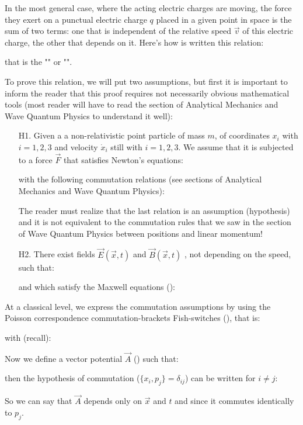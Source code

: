 	In the most general case, where the acting electric charges are moving, the force they exert on a punctual electric charge $q$ placed in a given point in space is the sum of two terms: one that is independent of the relative speed $\vec{v}$ of this electric charge, the other that depends on it. Here's how is written this relation:
	
	that is the "" or "".
	
	To prove this relation, we will put two assumptions, but first it is important to inform the reader that this proof requires not necessarily obvious mathematical tools (most reader will have to read the section of Analytical Mechanics and Wave Quantum Physics to understand it well):
	\begin{enumerate}
		\item[H1.] Given a a non-relativistic point particle of mass $m$, of coordinates $x_i$ with $i=1,2,3$ and velocity $\dot{x}_i$ still with $i=1,2,3$. We assume that it is subjected to a force $\vec{F}$ that satisfies Newton's equations:
		
		with the following commutation relations (see sections of Analytical Mechanics and Wave Quantum Physics):
		
	 	The reader must realize that the last relation is an assumption (hypothesis) and it is not equivalent to the commutation rules that we saw in the section of Wave Quantum Physics between positions and linear momentum!

		\item[H2.] There exist fields $\vec{E}(\vec{x},t)$ and $\vec{B}(\vec{x},t)$ , not depending on the speed, such that:
		
		and which satisfy the Maxwell equations ():
		
	\end{enumerate}
	At a classical level, we express the commutation assumptions by using the Poisson correspondence commutation-brackets Fish-switches (), that is:
	
	with (recall):
	
	Now we define a vector potential $\vec{A}$ () such that:
	
	then the hypothesis of commutation ($\{x_i,p_j\}=\delta_{ij}$)  can be written for $i\neq j$:
	
	So we can say that $\vec{A}$ depends only on $\vec{x}$ and $t$ and since it commutes identically to $p_j$.
	
